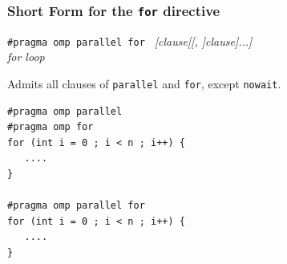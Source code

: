 \documentclass{beamer}
\begin{document}



  
  
  


\begin{frame}[fragile=singleslide]
  \frametitle{Short Form for the \texttt{for} directive}
  
\begin{framed}
  {\tt \#pragma omp parallel for } {\it  [clause[[, ]clause]...]}  \\
  {\it for loop} 
\end{framed}

Admits all clauses of {\tt parallel} and {\tt for}, except {\tt nowait}.

\medskip

\begin{verbatim}
#pragma omp parallel
#pragma omp for
for (int i = 0 ; i < n ; i++) {
   ....
}

#pragma omp parallel for
for (int i = 0 ; i < n ; i++) {
   ....
}
\end{verbatim}
\end{frame}
\end{document}
